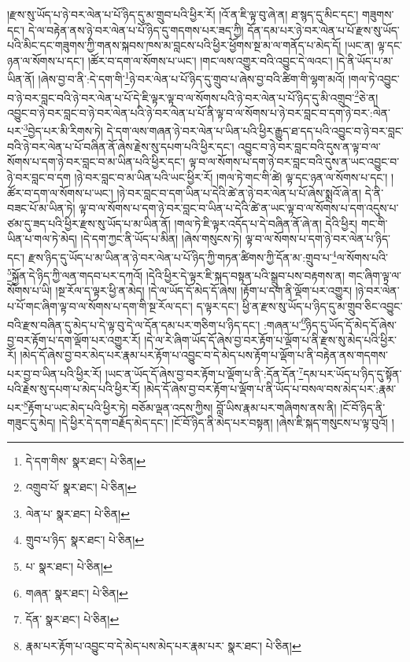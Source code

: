 །རྫས་སུ་ཡོད་པ་ཉེ་བར་ལེན་པ་པོ་ཉིད་དུ་མ་གྲུབ་པའི་ཕྱིར་རོ། །འོ་ན་ཇི་ལྟ་བུ་ཞེ་ན། ཐ་སྙད་དུ་མིང་དང་། གཟུགས་དང་། དེ་ལ་བརྟེན་ནས་ཉེ་བར་ལེན་པ་པོ་ཉིད་དུ་གདགས་པར་ཟད་ཀྱི། དོན་དམ་པར་ཉེ་བར་ལེན་པ་པོ་རྫས་སུ་ཡོད་པའི་མིང་དང་གཟུགས་ཀྱི་གནས་སྐབས་ཁས་མ་བླངས་པའི་ཕྱིར་ཕྱོགས་སྔ་མ་ལ་གནོད་པ་མེད་དོ། །ཡང་ན། ལྟ་དང་ཉན་ལ་སོགས་པ་དང་། །ཚོར་བ་དག་ལ་སོགས་པ་ཡང་། །གང་ལས་འགྱུར་བའི་འབྱུང་དེ་ལའང་། །དེ་ནི་ཡོད་པ་མ་ཡིན་ནོ། །ཞེས་བྱ་བ་ནི་:དེ་དག་གི་\footnote{དེ་དག་གིས་  སྣར་ཐང་།  པེ་ཅིན། }ཉེ་བར་ལེན་པ་པོ་ཉིད་དུ་གྲུབ་པ་ཞེས་བྱ་བའི་ཚིག་གི་ལྷག་མའོ། །གལ་ཏེ་འབྱུང་བ་ཉེ་བར་བླང་བའི་ཉེ་བར་ལེན་པ་པོ་དེ་ཇི་ལྟར་ལྟ་བ་ལ་སོགས་པའི་ཉེ་བར་ལེན་པ་པོ་ཉིད་དུ་མི་འགྲུབ་\footnote{འགྲུབ་པོ་  སྣར་ཐང་།  པེ་ཅིན། }ཅེ་ན། འབྱུང་བ་ཉེ་བར་བླང་བ་ཉེ་བར་ལེན་པའི་ཉེ་བར་ལེན་པ་པོ་ནི་ལྟ་བ་ལ་སོགས་པ་ཉེ་བར་བླང་བ་དག་ཉེ་བར་:ལེན་པར་\footnote{ལེན་པ་  སྣར་ཐང་།  པེ་ཅིན། }བྱེད་པར་མི་རིགས་ཏེ། དེ་དག་ལས་གཞན་ཉེ་བར་ལེན་པ་ཡིན་པའི་ཕྱིར་རྒྱུད་ཐ་དད་པའི་འབྱུང་བ་ཉེ་བར་བླང་བའི་ཉེ་བར་ལེན་པ་པོ་བཞིན་ནོ་ཞེས་རྗེས་སུ་དཔག་པའི་ཕྱིར་དང་། འབྱུང་བ་ཉེ་བར་བླང་བའི་དུས་ན་ལྟ་བ་ལ་སོགས་པ་དག་ཉེ་བར་བླང་བ་མ་ཡིན་པའི་ཕྱིར་དང་། ལྟ་བ་ལ་སོགས་པ་དག་ཉེ་བར་བླང་བའི་དུས་ན་ཡང་འབྱུང་བ་ཉེ་བར་བླང་བ་དག །ཉེ་བར་བླང་བ་མ་ཡིན་པའི་ཡང་ཕྱིར་རོ། །གལ་ཏེ་གང་གི་ཚེ། ལྟ་དང་ཉན་ལ་སོགས་པ་དང་། །ཚོར་བ་དག་ལ་སོགས་པ་ཡང་། །ཉེ་བར་བླང་བ་དག་ཡིན་པ་དེའི་ཚེ་ན་ཉེ་བར་ལེན་པ་པོ་ཞེས་སྨྲའོ་ཞེ་ན། དེ་ནི་བཟང་པོ་མ་ཡིན་ཏེ། ལྟ་བ་ལ་སོགས་པ་དག་ཉེ་བར་བླང་བ་ཡིན་པ་དེའི་ཚེ་ན་ཡང་ལྟ་བ་ལ་སོགས་པ་དག་འདུས་པ་ཙམ་དུ་ཟད་པའི་ཕྱིར་རྫས་སུ་ཡོད་པ་མ་ཡིན་ནོ། །གལ་ཏེ་ཇི་ལྟར་འདོད་པ་དེ་བཞིན་ནོ་ཞེ་ན། དེའི་ཕྱིར། གང་གི་ཡིན་པ་གལ་ཏེ་མེད། །དེ་དག་ཀྱང་ནི་ཡོད་པ་མིན། །ཞེས་གསུངས་ཏེ། ལྟ་བ་ལ་སོགས་པ་དག་ཉེ་བར་ལེན་པ་ཉིད་དང་། རྫས་ཉིད་དུ་ཡོད་པ་མ་ཡིན་ན་ཉེ་བར་ལེན་པ་པོ་ཉིད་ཀྱི་གཏན་ཚིགས་ཀྱི་དོན་མ་:གྲུབ་པ་\footnote{གྲུབ་པ་ཉིད་  སྣར་ཐང་།  པེ་ཅིན། }ལ་སོགས་པའི་\footnote{པ་  སྣར་ཐང་།  པེ་ཅིན། }སྐྱོན་དེ་ཉིད་ཀྱི་ལན་གདབ་པར་དཀའོ། །དེའི་ཕྱིར་དེ་ལྟར་ཇི་སྐད་བསྟན་པའི་སྒྲུབ་པས་བརྟགས་ན། གང་ཞིག་ལྟ་ལ་སོགས་པ་ཡི། །སྔ་རོལ་ད་ལྟར་ཕྱི་ན་མེད། །དེ་ལ་ཡོད་དོ་མེད་དོ་ཞེས། །རྟོག་པ་དག་ནི་ལྡོག་པར་འགྱུར། །ཉེ་བར་ལེན་པ་པོ་གང་ཞིག་ལྟ་བ་ལ་སོགས་པ་དག་གི་སྔ་རོལ་དང་། ད་ལྟར་དང་། ཕྱི་ན་རྫས་སུ་ཡོད་པ་ཉིད་དུ་མ་གྲུབ་ཅིང་འབྱུང་བའི་རྫས་བཞིན་དུ་མེད་པ་དེ་ལྟ་བུ་དེ་ལ་དོན་དམ་པར་གཅིག་པ་ཉིད་དང་། :གཞན་པ་\footnote{གཞན་  སྣར་ཐང་།  པེ་ཅིན། }ཉིད་དུ་ཡོད་དོ་མེད་དོ་ཞེས་བྱ་བར་རྟོག་པ་དག་ལྡོག་པར་འགྱུར་རོ། །དེ་ལ་རེ་ཞིག་ཡོད་དོ་ཞེས་བྱ་བར་རྟོག་པ་ལྡོག་པ་ནི་རྫས་སུ་མེད་པའི་ཕྱིར་རོ། །མེད་དོ་ཞེས་བྱ་བར་མེད་པར་རྣམ་པར་རྟོག་པ་འབྱུང་བ་དེ་མེད་པས་རྟོག་པ་ལྡོག་པ་ནི་བརྟེན་ནས་གདགས་པར་བྱ་བ་ཡིན་པའི་ཕྱིར་རོ། །ཡང་ན་ཡོད་དོ་ཞེས་བྱ་བར་རྟོག་པ་ལྡོག་པ་ནི་:དོན་དོན་\footnote{དོན་  སྣར་ཐང་།  པེ་ཅིན། }དམ་པར་ཡོད་པ་ཉིད་དུ་སྟོན་པའི་རྗེས་སུ་དཔག་པ་མེད་པའི་ཕྱིར་རོ། །མེད་དོ་ཞེས་བྱ་བར་རྟོག་པ་ལྡོག་པ་ནི་ཡོད་པ་བསལ་བས་མེད་པར་:རྣམ་པར་\footnote{རྣམ་པར་རྟོག་པ་འབྱུང་བ་དེ་མེད་པས་མེད་པར་རྣམ་པར་  སྣར་ཐང་།  པེ་ཅིན། }རྟོག་པ་ཡང་མེད་པའི་ཕྱིར་ཏེ། བཅོམ་ལྡན་འདས་ཀྱིས། བློ་ཡིས་རྣམ་པར་གཞིགས་ནས་ནི། །ངོ་བོ་ཉིད་ནི་གཟུང་དུ་མེད། །དེ་ཕྱིར་དེ་དག་བརྗོད་མེད་དང་། །ངོ་བོ་ཉིད་ནི་མེད་པར་བསྟན། །ཞེས་ཇི་སྐད་གསུངས་པ་ལྟ་བུའོ། །
